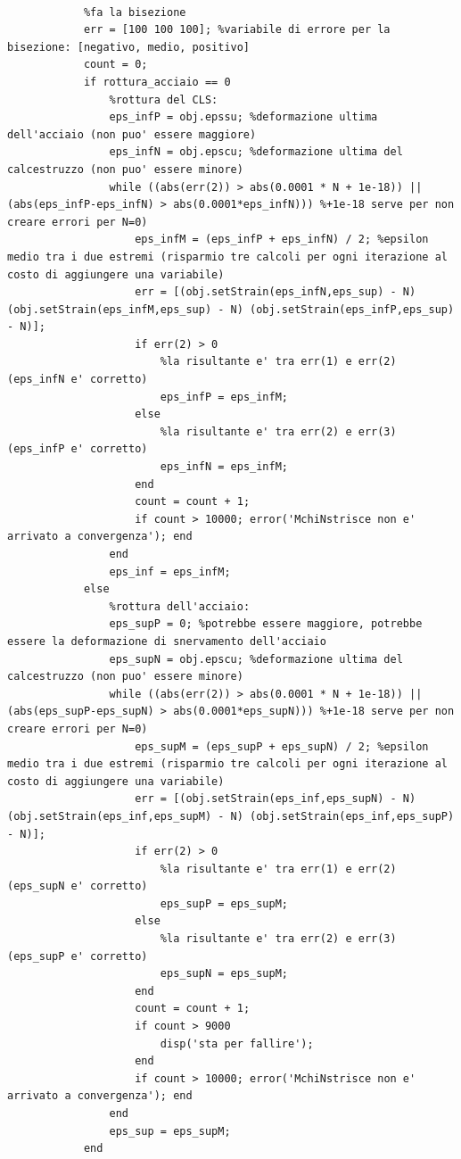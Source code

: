 \documentclass[10pt]{article}
\begin{document}
\begin{lstlisting}
            
            %fa la bisezione
            err = [100 100 100]; %variabile di errore per la bisezione: [negativo, medio, positivo]
            count = 0;
            if rottura_acciaio == 0
                %rottura del CLS:
                eps_infP = obj.epssu; %deformazione ultima dell'acciaio (non puo' essere maggiore)
                eps_infN = obj.epscu; %deformazione ultima del calcestruzzo (non puo' essere minore)
                while ((abs(err(2)) > abs(0.0001 * N + 1e-18)) || (abs(eps_infP-eps_infN) > abs(0.0001*eps_infN))) %+1e-18 serve per non creare errori per N=0)
                    eps_infM = (eps_infP + eps_infN) / 2; %epsilon medio tra i due estremi (risparmio tre calcoli per ogni iterazione al costo di aggiungere una variabile)
                    err = [(obj.setStrain(eps_infN,eps_sup) - N) (obj.setStrain(eps_infM,eps_sup) - N) (obj.setStrain(eps_infP,eps_sup) - N)];
                    if err(2) > 0
                        %la risultante e' tra err(1) e err(2) (eps_infN e' corretto)
                        eps_infP = eps_infM;
                    else
                        %la risultante e' tra err(2) e err(3) (eps_infP e' corretto)
                        eps_infN = eps_infM;
                    end
                    count = count + 1;
                    if count > 10000; error('MchiNstrisce non e' arrivato a convergenza'); end
                end
                eps_inf = eps_infM;
            else
                %rottura dell'acciaio:
                eps_supP = 0; %potrebbe essere maggiore, potrebbe essere la deformazione di snervamento dell'acciaio
                eps_supN = obj.epscu; %deformazione ultima del calcestruzzo (non puo' essere minore)
                while ((abs(err(2)) > abs(0.0001 * N + 1e-18)) || (abs(eps_supP-eps_supN) > abs(0.0001*eps_supN))) %+1e-18 serve per non creare errori per N=0)
                    eps_supM = (eps_supP + eps_supN) / 2; %epsilon medio tra i due estremi (risparmio tre calcoli per ogni iterazione al costo di aggiungere una variabile)
                    err = [(obj.setStrain(eps_inf,eps_supN) - N) (obj.setStrain(eps_inf,eps_supM) - N) (obj.setStrain(eps_inf,eps_supP) - N)];
                    if err(2) > 0
                        %la risultante e' tra err(1) e err(2) (eps_supN e' corretto)
                        eps_supP = eps_supM;
                    else
                        %la risultante e' tra err(2) e err(3) (eps_supP e' corretto)
                        eps_supN = eps_supM;
                    end
                    count = count + 1;
                    if count > 9000
                        disp('sta per fallire');
                    end
                    if count > 10000; error('MchiNstrisce non e' arrivato a convergenza'); end
                end
                eps_sup = eps_supM;
            end
            

\end{lstlisting}
\end{document}
